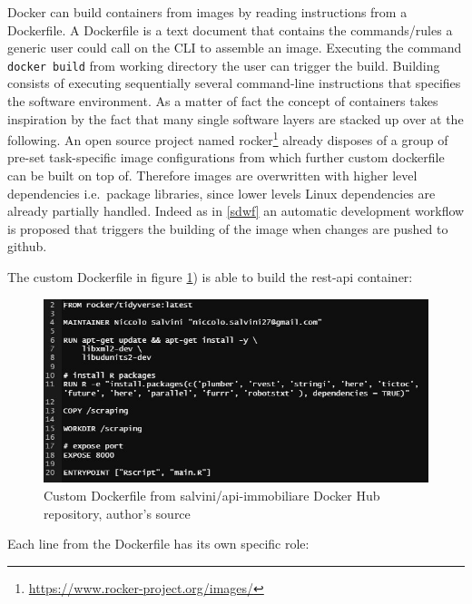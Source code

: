 \documentclass[
  12pt,
  a4paper,
  oneside]{book}
\newcommand{\passthrough}[1]{#1}
\DeclareRobustCommand{\href}[2]{#2\footnote{\url{#1}}}
\theoremstyle{definition}
\theoremstyle{definition}
\theoremstyle{definition}
\theoremstyle{remark}
\begin{document}
Docker can build containers from images by reading instructions from a Dockerfile. A Dockerfile is a text document that contains the commands/rules a generic user could call on the CLI to assemble an image. Executing the command \passthrough{\lstinline!docker build!} from working directory the user can trigger the build. Building consists of executing sequentially several command-line instructions that specifies the software environment. As a matter of fact the concept of containers takes inspiration by the fact that many single software layers are stacked up over at the following. An open source project named \href{https://www.rocker-project.org/images/}{rocker} already disposes of a group of pre-set task-specific image configurations from which further custom dockerfile can be built on top of.
Therefore images are overwritten with higher level dependencies i.e.~package libraries, since lower levels Linux dependencies are already partially handled. Indeed as in \ref{sdwf} an automatic development workflow is proposed that triggers the building of the image when changes are pushed to github.

The custom Dockerfile in figure \ref{fig:dockerfile}) is able to build the rest-api container:

\begin{figure}
\centering
\includegraphics{images/dockerfile2.PNG.jpg}
\caption{\label{fig:dockerfile}Custom Dockerfile from salvini/api-immobiliare Docker Hub repository, author's source}
\end{figure}

Each line from the Dockerfile has its own specific role:
\end{document}
